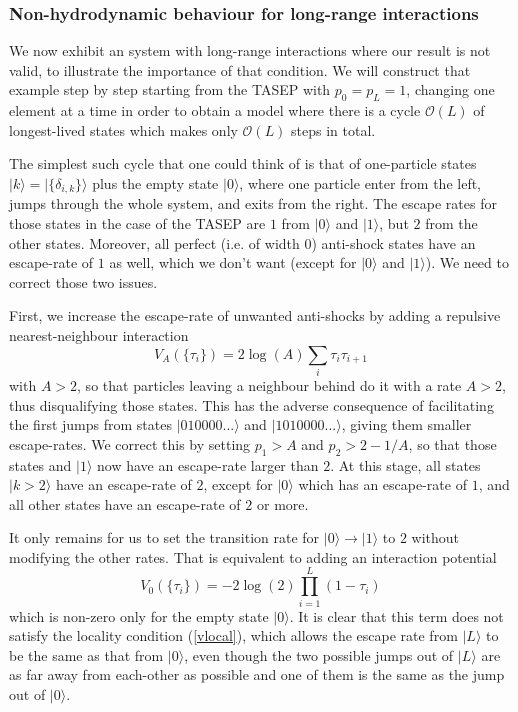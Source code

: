 \documentclass[aps,pre,onecolumn,showpacs,showkeys,a4paper]{revtex4-1}
\begin{document}
\subsubsection{Non-hydrodynamic behaviour for long-range interactions}
\label{IVd2}

We now exhibit an system with long-range interactions where our result is not valid, to illustrate the importance of that condition. We will construct that example step by step starting from the TASEP with $p_0=p_L=1$, changing one element at a time in order to obtain a model where there is a cycle $\mathcal{O}(L)$ of longest-lived states which makes only $\mathcal{O}(L)$ steps in total.

The simplest such cycle that one could think of is that of one-particle states $|k\rangle=|\{\delta_{i,k}\}\rangle$ plus the empty state $|0\rangle$, where one particle enter from the left, jumps through the whole system, and exits from the right. The escape rates for those states in the case of the TASEP are $1$ from $|0\rangle$ and $|1\rangle$, but $2$ from the other states. Moreover, all perfect (i.e. of width $0$) anti-shock states have an escape-rate of $1$ as well, which we don't want (except for $|0\rangle$ and $|1\rangle$). We need to correct those two issues.

First, we increase the escape-rate of unwanted anti-shocks by adding a repulsive nearest-neighbour interaction
\begin{equation}
V_A(\{\tau_i\})=2\log(A)\sum\limits_{i}\tau_i \tau_{i+1}
\end{equation}
with $A>2$, so that particles leaving a neighbour behind do it with a rate $A>2$, thus disqualifying those states. This has the adverse consequence of facilitating the first jumps from states $|010000...\rangle$ and $|1010000...\rangle$, giving them smaller escape-rates. We correct this by setting $p_1>A$ and $p_2>2-1/A$, so that those states and $|1\rangle$ now have an escape-rate larger than $2$. At this stage, all states $|k>2\rangle$ have an escape-rate of $2$, except for $|0\rangle$ which has an escape-rate of $1$, and all other states have an escape-rate of $2$ or more.

It only remains for us to set the transition rate for $|0\rangle\rightarrow|1\rangle$ to $2$ without modifying the other rates. That is equivalent to adding an interaction potential
\begin{equation}
V_0(\{\tau_i\})=-2\log(2)\prod\limits_{i=1}^{L}(1-\tau_i)
\end{equation}
which is non-zero only for the empty state $|0\rangle$. It is clear that this term does not satisfy the locality condition (\ref{vlocal}), which allows the escape rate from $|L\rangle$ to be the same as that from $|0\rangle$, even though the two possible jumps out of $|L\rangle$ are as far away from each-other as possible and one of them is the same as the jump out of $|0\rangle$.
\end{document}
